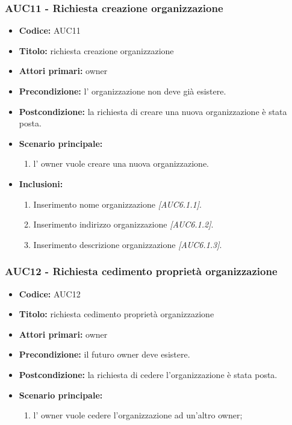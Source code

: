 \documentclass[casi-duso]{subfiles}
\begin{document}
\subsubsection{AUC11 - Richiesta creazione organizzazione}%
\label{subsub:AUC11}
\begin{itemize}
  \item \textbf{Codice:} AUC11
  \item \textbf{Titolo:} richiesta creazione organizzazione
  \item \textbf{Attori primari:} owner
  \item \textbf{Precondizione:} l' organizzazione non deve già esistere.
  \item \textbf{Postcondizione:} la richiesta di creare una nuova organizzazione è stata posta.
  \item \textbf{Scenario principale:}
  \begin{enumerate}
    \item l' owner vuole creare una nuova organizzazione.
  \end{enumerate}
  \item \textbf{Inclusioni:}
  \begin{enumerate}
    \item Inserimento nome organizzazione \emph{[AUC6.1.1]}.
    \item Inserimento indirizzo organizzazione \emph{[AUC6.1.2]}.
    \item Inserimento descrizione organizzazione \emph{[AUC6.1.3]}.
  \end{enumerate}
\end{itemize}

\subsubsection{AUC12 - Richiesta cedimento proprietà organizzazione}%
\label{subsub:AUC12}
\begin{itemize}
  \item \textbf{Codice:} AUC12
  \item \textbf{Titolo:} richiesta cedimento proprietà organizzazione
  \item \textbf{Attori primari:} owner
  \item \textbf{Precondizione:} il futuro owner deve esistere.
  \item \textbf{Postcondizione:} la richiesta di cedere l'organizzazione è stata posta.
  \item \textbf{Scenario principale:} 
  \begin{enumerate}
    \item l' owner vuole cedere l'organizzazione ad un'altro owner;
  \end{enumerate}
\end{itemize}
\end{document}
